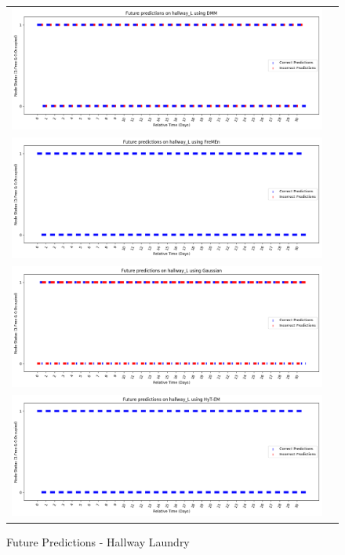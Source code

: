 \begin{figure}[!Hp]
  \begin{tabular}{cc}
    {\includegraphics[width = 6in]{images/results/Future_hallway_L_DMM.png}} \\
    {\includegraphics[width = 6in]{images/results/Future_hallway_L_FreMEn.png}} \\
    {\includegraphics[width = 6in]{images/results/Future_hallway_L_Gaussian.png}} \\
    {\includegraphics[width = 6in]{images/results/Future_hallway_L_HyT-EM.png}} \\
  \end{tabular}
  \caption{Future Predictions - Hallway Laundry}
\end{figure}

